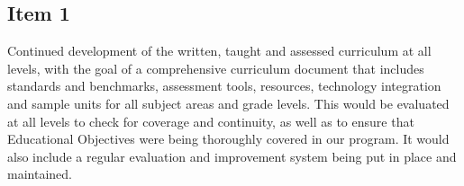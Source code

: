 
\subsection{Item 1}


Continued development of the written, taught and assessed curriculum at all levels, with the goal of a comprehensive curriculum document that includes standards and benchmarks, assessment tools, resources, technology integration and sample units for all subject areas and grade levels. This would be evaluated at all levels to check for coverage and continuity, as well as to ensure that Educational Objectives were being thoroughly covered in our program. It would also include a regular evaluation and improvement system being put in place and maintained.

